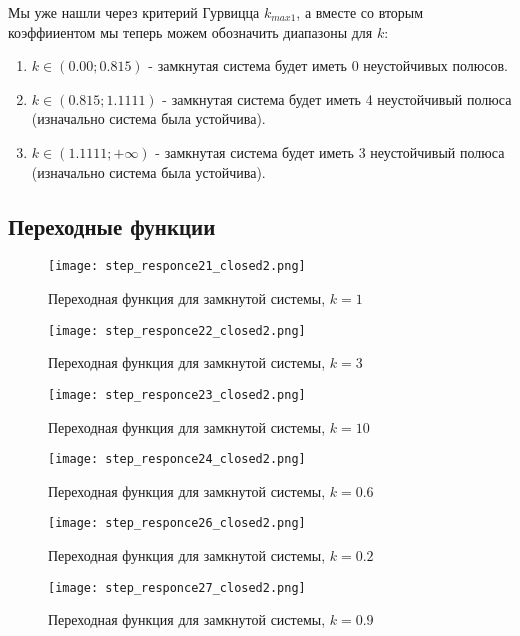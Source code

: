 Мы уже нашли через критерий Гурвицца $k_{max1}$, а вместе со вторым коэффииентом мы теперь можем обозначить диапазоны для $k$:
\begin{enumerate}
    \item $k\in(0.00 ; 0.815)$ - замкнутая система будет иметь 0 неустойчивых полюсов.
    \item $k\in(0.815 ; 1.1111)$ - замкнутая система будет иметь 4 неустойчивый полюса (изначально система была устойчива). 
    \item $k\in(1.1111 ; +\infty)$ - замкнутая система будет иметь 3 неустойчивый полюса (изначально система была устойчива). 
\end{enumerate}




\newpage
\subsection{Переходные функции}
\begin{figure}[ht]
    \centering
    \texttt{[image: step\_responce21\_closed2.png]}
    \caption{Переходная функция для замкнутой системы, $k=1$}
\end{figure}
\begin{figure}[ht]
    \centering
    \texttt{[image: step\_responce22\_closed2.png]}
    \caption{Переходная функция для замкнутой системы, $k=3$}
\end{figure}

\newpage
\begin{figure}[ht]
    \centering
    \texttt{[image: step\_responce23\_closed2.png]}
    \caption{Переходная функция для замкнутой системы, $k=10$}
\end{figure}
\begin{figure}[ht]
    \centering
    \texttt{[image: step\_responce24\_closed2.png]}
    \caption{Переходная функция для замкнутой системы, $k=0.6$}
\end{figure}
\newpage
\begin{figure}[ht]
    \centering
    \texttt{[image: step\_responce26\_closed2.png]}
    \caption{Переходная функция для замкнутой системы, $k=0.2$}
\end{figure}
\begin{figure}[ht]
    \centering
    \texttt{[image: step\_responce27\_closed2.png]}
    \caption{Переходная функция для замкнутой системы, $k=0.9$}
\end{figure}

